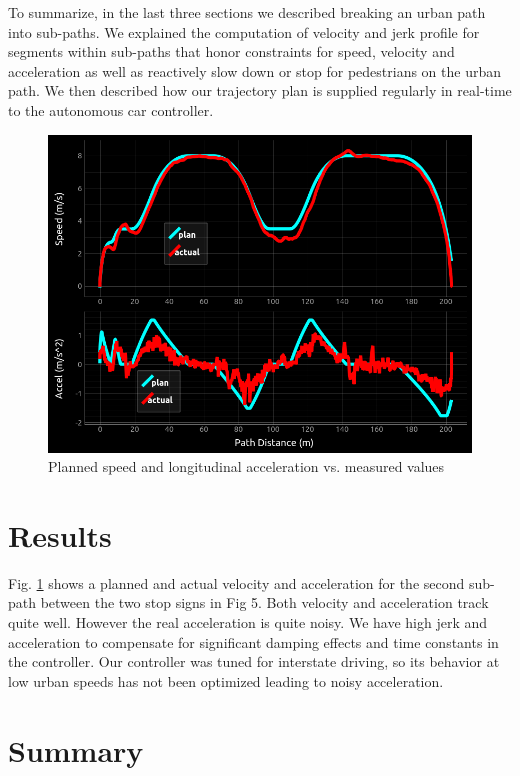 \documentclass[letterpaper, 10 pt, conference]{ieeeconf}  %
\begin{document}

To summarize, in the last three sections we described breaking an urban path into sub-paths. We 
explained the computation of velocity and jerk profile for segments within sub-paths that honor constraints
for speed, velocity and acceleration as well as reactively slow down or stop for pedestrians on
the urban path. We then described how our trajectory plan is supplied regularly in real-time to the
autonomous car controller.

\begin{figure}[tb]
  \centering
  \includegraphics[width=0.65\columnwidth]{graphics/results_final.png}
  \caption{Planned speed and longitudinal acceleration vs. measured values}

  \label{fig:results}
\end{figure}


\section{Results} \label{sec:results}

Fig. \ref{fig:results} shows a planned and actual velocity and acceleration for the second sub-path between the two stop signs in Fig 5. Both velocity and acceleration track quite well. However the real acceleration is quite noisy. We have high jerk and acceleration to compensate for significant damping effects and time constants in the controller. %
Our controller was tuned for interstate driving, so its behavior at low urban speeds has not been optimized leading to noisy acceleration.

\section{Summary} \label{sec:summary}
\end{document}
